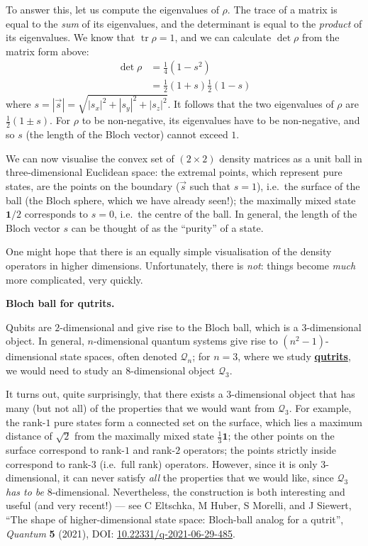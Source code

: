 \documentclass[fleqn,a4paper]{article}
\newenvironment{technical}[1]{\textbf{#1.}\par\vspace{.5\baselineskip}\everypar{\setlength{\parindent}{1.5em}}}{}
\theoremstyle{definition}
\theoremstyle{definition}
\theoremstyle{definition}
\theoremstyle{definition}
\theoremstyle{remark}
\begin{document}
To answer this, let us compute the eigenvalues of \(\rho\).
The trace of a matrix is equal to the \emph{sum} of its eigenvalues, and the determinant is equal to the \emph{product} of its eigenvalues.
We know that \(\operatorname{tr}\rho=1\), and we can calculate \(\det\rho\) from the matrix form above:
\[
  \begin{aligned}
    \det\rho
    &= \frac{1}{4}(1-s^2)
  \\&= \frac{1}{2}(1+s)\frac{1}{2}(1-s)
  \end{aligned}
\]
where \(s=|\vec{s}|=\sqrt{|s_x|^2+|s_y|^2+|s_z|^2}\).
It follows that the two eigenvalues of \(\rho\) are \(\frac{1}{2}(1\pm s)\).
For \(\rho\) to be non-negative, its eigenvalues have to be non-negative, and so \(s\) (the length of the Bloch vector) cannot exceed \(1\).

We can now visualise the convex set of \((2\times 2)\) density matrices as a unit ball in three-dimensional Euclidean space: the extremal points, which represent pure states, are the points on the boundary (\(\vec{s}\) such that \(s=1\)), i.e.~the surface of the ball (the Bloch sphere, which we have already seen!); the maximally mixed state \(\mathbf{1}/2\) corresponds to \(s=0\), i.e.~the centre of the ball.
In general, the length of the Bloch vector \(s\) can be thought of as the ``purity'' of a state.

One might hope that there is an equally simple visualisation of the density operators in higher dimensions.
Unfortunately, there is \emph{not}: things become \emph{much} more complicated, very quickly.

\begin{technical}{Bloch ball for qutrits}
Qubits are \(2\)-dimensional and give rise to the Bloch ball, which is a \(3\)-dimensional object.
In general, \(n\)-dimensional quantum systems give rise to \((n^2-1)\)-dimensional state spaces, often denoted \(\mathcal{Q}_n\); for \(n=3\), where we study \href{https://en.wikipedia.org/wiki/Qutrit}{\textbf{qutrits}}, we would need to study an \(8\)-dimensional object \(\mathcal{Q}_3\).

It turns out, quite surprisingly, that there exists a \(3\)-dimensional object that has many (but not all) of the properties that we would want from \(\mathcal{Q}_3\).
For example, the rank-\(1\) pure states form a connected set on the surface, which lies a maximum distance of \(\sqrt{2}\) from the maximally mixed state \(\frac13\mathbf{1}\); the other points on the surface correspond to rank-\(1\) and rank-\(2\) operators; the points strictly inside correspond to rank-\(3\) (i.e.~full rank) operators.
However, since it is only \(3\)-dimensional, it can never satisfy \emph{all} the properties that we would like, since \(\mathcal{Q}_3\) \emph{has to be} \(8\)-dimensional.
Nevertheless, the construction is both interesting and useful (and very recent!) --- see C Eltschka, M Huber, S Morelli, and J Siewert, ``The shape of higher-dimensional state space: Bloch-ball analog for a qutrit'', \emph{Quantum} \textbf{5} (2021), DOI: \href{https://doi.org/10.22331/q-2021-06-29-485}{10.22331/q-2021-06-29-485}.

\end{technical}
\end{document}
